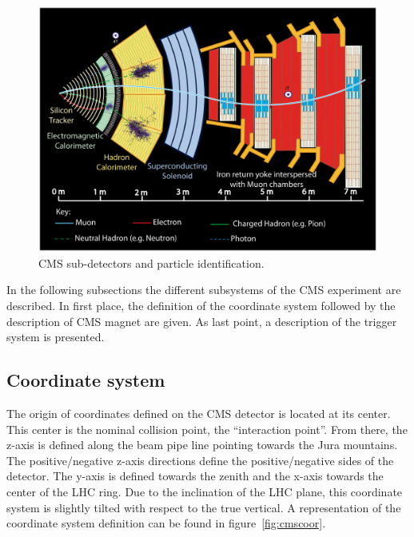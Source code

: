 \begin{figure}[!Hhtbp]
  \begin{center}
    \includegraphics[width=\textwidth]{figs/PictureforPoint5_oct04_allp.jpg}
    \caption{CMS sub-detectors and particle identification. }
    \label{fig:cmsslice}
  \end{center}
\end{figure}

In the following subsections the different subsystems of the CMS experiment are described. In first place, the definition of the coordinate system followed by the description of CMS magnet are given. As last point, a description of the trigger system is presented. 

\subsection{Coordinate system}
\label{sec:Csys}

The origin of coordinates defined on the CMS detector is located at its center. This center is the nominal collision point, the ``interaction point''. From there, the z-axis is defined along the beam pipe line pointing towards the Jura mountains. The positive/negative z-axis directions define the positive/negative sides of the detector. The y-axis is defined towards the zenith and the x-axis towards the center of the LHC ring. Due to the inclination of the LHC plane, this coordinate system is slightly tilted with respect to the true vertical. A representation of the coordinate system definition can be found in figure~\ref{fig:cmscoor}. 

